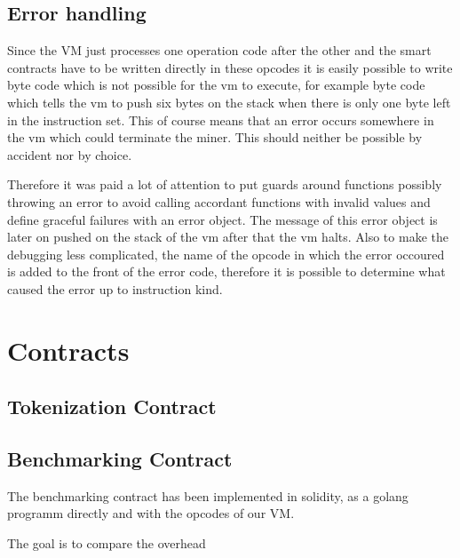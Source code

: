 \subsection{Error handling}
Since the VM just processes one operation code after the other and the smart contracts have to be written directly in these opcodes it is easily possible to write byte code which is not possible for the vm to execute, for example byte code which tells the vm to push six bytes on the stack when there is only one byte left in the instruction set. This of course means that an error occurs somewhere in the vm which could terminate the miner. This should neither be possible by accident nor by choice.

Therefore it was paid a lot of attention to put guards around functions possibly throwing an error to avoid calling accordant functions with invalid values and define graceful failures with an error object. The message of this error object is later on pushed on the stack of the vm after that the vm halts. Also to make the debugging less complicated, the name of the opcode in which the error occoured is added to the front of the error code, therefore it is possible to determine what caused the error up to instruction kind.


\section{Contracts}

\subsection{Tokenization Contract}

\subsection{Benchmarking Contract}
The benchmarking contract has been implemented in solidity, as a golang programm directly and with the opcodes of our VM. 

The goal is to compare the overhead
